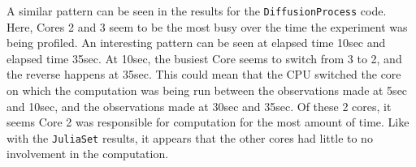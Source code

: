 \documentclass[a4paper,12pt]{article}
\begin{document}
A similar pattern can be seen in the results for the \verb|DiffusionProcess| code. Here, Cores 2 and 3 seem to be the most busy over the time the experiment was being profiled. An interesting pattern can be seen at elapsed time 10sec and elapsed time 35sec. At 10sec, the busiest Core seems to switch from 3 to 2, and the reverse happens at 35sec. This could mean that the CPU switched the core on which the computation was being run between the observations made at 5sec and 10sec, and the observations made at 30sec and 35sec. Of these 2 cores, it seems Core 2 was responsible for computation for the most amount of time. Like with the \verb|JuliaSet| results, it appears that the other cores had little to no involvement in the computation. 



\end{document}
